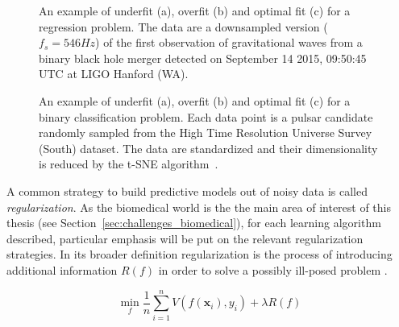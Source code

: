     \begin{figure}[!h]
    	\centering
        \hfill%
    	\caption{An example of underfit (a), overfit (b) and optimal fit (c) for a regression problem. The data are a downsampled version ($f_s = 546 Hz$) of the first observation of gravitational waves from a binary black hole merger detected on September 14 2015, 09:50:45 UTC at LIGO Hanford (WA).}\label{fig:regression_fit}
    \end{figure}

    \begin{figure}[!h]
	\centering
	\hfill%
	\caption{An example of underfit (a), overfit (b) and optimal fit (c) for a binary classification problem. Each data point is a pulsar candidate randomly sampled from the High Time Resolution Universe Survey (South) dataset. The data are standardized and their dimensionality is reduced by the t-SNE algorithm~\cite{van2008visualizing}. }\label{fig:classification_fit}
\end{figure}

    
    A common strategy to build predictive models out of noisy data is called \textit{regularization}. As the biomedical world is the the main area of interest of this thesis (see Section~\ref{sec:challenges_biomedical}), for each learning algorithm described, particular emphasis will be put on the relevant regularization strategies.    
    In its broader definition regularization is the process of introducing additional information $R(f)$ in order to solve a possibly ill-posed problem \cite{tikhonov1963solution, evgeniou2000regularization}. 
    
     \begin{equation}\label{eq:losspen}
    	\min_f \frac{1}{n}\sum_{i=1}^n V(f(\bm{x}_i),y_i) + \lambda R(f)
    \end{equation}
    
